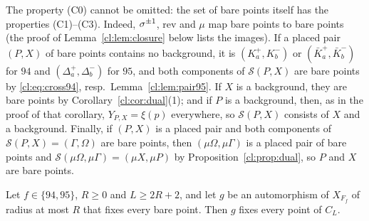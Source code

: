 The property (C0) cannot be omitted: the set of bare points itself has the properties (C1)--(C3). Indeed, $\sigma^{\pm1}$, $\mathrm{rev}$ and $\mu$ map bare points to bare points (the proof of Lemma~\ref{cl:lem:closure} below lists the images). If a placed pair $(P,X)$ of bare points contains no background, it is $(K^+_a,K^-_b)$ or $(\bar K^+_a,\bar K^-_b)$ for $94$ and $(\Delta^+_a,\Delta^-_b)$ for $95$, and both components of $\mathcal S(P,X)$ are bare points by \eqref{cl:eq:cross94}, resp.\ Lemma~\ref{cl:lem:pair95}. If $X$ is a background, they are bare points by Corollary~\ref{cl:cor:dual}(1); and if $P$ is a background, then, as in the proof of that corollary, $Y_{P,X}=\xi(p)$ everywhere, so $\mathcal S(P,X)$ consists of $X$ and a background. Finally, if $(P,X)$ is a placed pair and both components of $\mathcal S(P,X)=(\Gamma,\Omega)$ are bare points, then $(\mu\Omega,\mu\Gamma)$ is a placed pair of bare points and $\mathcal S(\mu\Omega,\mu\Gamma)=(\mu X,\mu P)$ by Proposition~\ref{cl:prop:dual}, so $P$ and $X$ are bare points.

\begin{lemma}\label{cl:lem:closure}
Let $f\in\{94,95\}$, $R\ge0$ and $L\ge2R+2$, and let $g$ be an automorphism of $X_{F_f}$ of radius at most $R$ that fixes every bare point. Then $g$ fixes every point of $C_L$.
\end{lemma}

